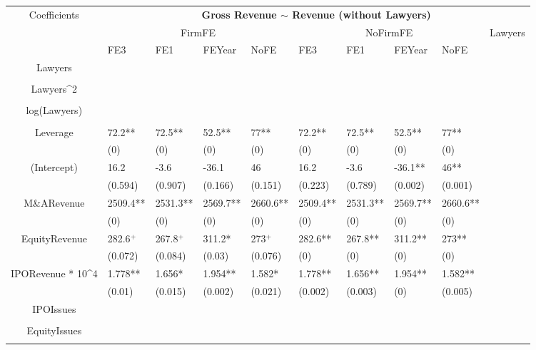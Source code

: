 \documentclass{article}
\begin{document}
\begin{table}[H]
\centering
\begin{tabular}{|clllllllll|}
\hline
\multirow{3}{*}{Coefficients} & \multicolumn{9}{c|}{\textbf{Gross Revenue $\sim$ Revenue (without Lawyers)}} \\
\cline{2-10}
& \multicolumn{4}{c}{FirmFE} & \multicolumn{4}{c}{NoFirmFE} & \multirow{2}{*}{Lawyers} \\
\cline{2-9}
& FE3 & FE1 & FEYear & NoFE & FE3 & FE1 & FEYear & NoFE &  \\
\hline
 
Lawyers &  &  &  &  &  &  &  &  & \\ 
   &  &  &  &  &  &  &  &  & \\ 
  Lawyers^2 &  &  &  &  &  &  &  &  & \\ 
   &  &  &  &  &  &  &  &  & \\ 
  log(Lawyers) &  &  &  &  &  &  &  &  & \\ 
   &  &  &  &  &  &  &  &  & \\ 
  Leverage & 72.2** & 72.5** & 52.5** & 77** & 72.2** & 72.5** & 52.5** & 77** & \\ 
   & (0) & (0) & (0) & (0) & (0) & (0) & (0) & (0) & \\ 
  (Intercept) & 16.2 & -3.6 & -36.1 & 46 & 16.2 & -3.6 & -36.1** & 46** & \\ 
   & (0.594) & (0.907) & (0.166) & (0.151) & (0.223) & (0.789) & (0.002) & (0.001) & \\ 
  M\&ARevenue & 2509.4** & 2531.3** & 2569.7** & 2660.6** & 2509.4** & 2531.3** & 2569.7** & 2660.6** & \\ 
   & (0) & (0) & (0) & (0) & (0) & (0) & (0) & (0) & \\ 
  EquityRevenue & 282.6$^{+}$ & 267.8$^{+}$ & 311.2* & 273$^{+}$ & 282.6** & 267.8** & 311.2** & 273** & \\ 
   & (0.072) & (0.084) & (0.03) & (0.076) & (0) & (0) & (0) & (0) & \\ 
  IPORevenue * 10^4 & 1.778** & 1.656* & 1.954** & 1.582* & 1.778** & 1.656** & 1.954** & 1.582** & \\ 
   & (0.01) & (0.015) & (0.002) & (0.021) & (0.002) & (0.003) & (0) & (0.005) & \\ 
  IPOIssues &  &  &  &  &  &  &  &  & \\ 
   &  &  &  &  &  &  &  &  & \\ 
  EquityIssues &  &  &  &  &  &  &  &  & \\ 
   &  &  &  &  &  &  &  &  & \\ 

\end{tabular}
\end{table}
\end{document}
